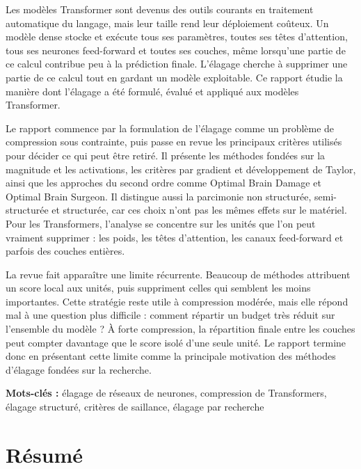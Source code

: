 Les mod\`eles Transformer sont devenus des outils courants en traitement automatique du langage, mais leur taille rend leur d\'eploiement co\^uteux. Un mod\`ele dense stocke et ex\'ecute tous ses param\`etres, toutes ses t\^etes d'attention, tous ses neurones feed-forward et toutes ses couches, m\^eme lorsqu'une partie de ce calcul contribue peu \`a la pr\'ediction finale. L'\'elagage cherche \`a supprimer une partie de ce calcul tout en gardant un mod\`ele exploitable. Ce rapport \'etudie la mani\`ere dont l'\'elagage a \'et\'e formul\'e, \'evalu\'e et appliqu\'e aux mod\`eles Transformer.

Le rapport commence par la formulation de l'\'elagage comme un probl\`eme de compression sous contrainte, puis passe en revue les principaux crit\`eres utilis\'es pour d\'ecider ce qui peut \^etre retir\'e. Il pr\'esente les m\'ethodes fond\'ees sur la magnitude et les activations, les crit\`eres par gradient et d\'eveloppement de Taylor, ainsi que les approches du second ordre comme Optimal Brain Damage et Optimal Brain Surgeon. Il distingue aussi la parcimonie non structur\'ee, semi-structur\'ee et structur\'ee, car ces choix n'ont pas les m\^emes effets sur le mat\'eriel. Pour les Transformers, l'analyse se concentre sur les unit\'es que l'on peut vraiment supprimer : les poids, les t\^etes d'attention, les canaux feed-forward et parfois des couches enti\`eres.

La revue fait appara\^itre une limite r\'ecurrente. Beaucoup de m\'ethodes attribuent un score local aux unit\'es, puis suppriment celles qui semblent les moins importantes. Cette strat\'egie reste utile \`a compression mod\'er\'ee, mais elle r\'epond mal \`a une question plus difficile : comment r\'epartir un budget tr\`es r\'eduit sur l'ensemble du mod\`ele ? \`A forte compression, la r\'epartition finale entre les couches peut compter davantage que le score isol\'e d'une seule unit\'e. Le rapport termine donc en pr\'esentant cette limite comme la principale motivation des m\'ethodes d'\'elagage fond\'ees sur la recherche.

\vspace{1em}
\noindent\textbf{Mots-cl\'es :} \'elagage de r\'eseaux de neurones, compression de Transformers, \'elagage structur\'e, crit\`eres de saillance, \'elagage par recherche

\clearpage

\iffalse

\clearpage

\chapter*{Résumé}

